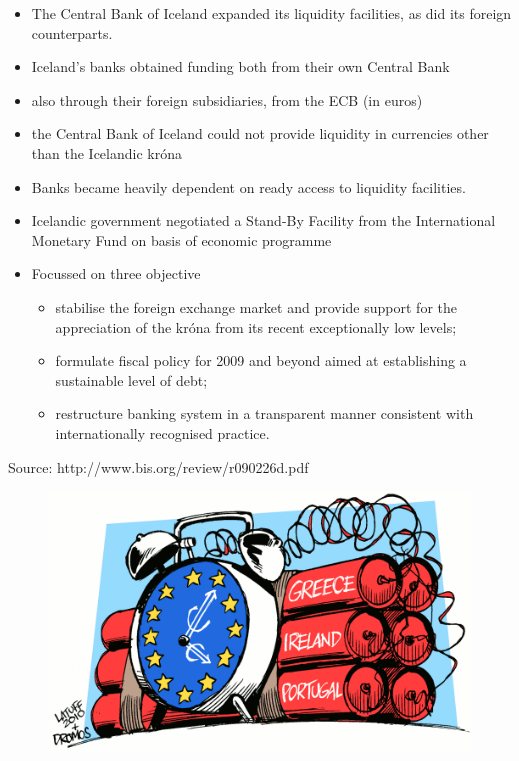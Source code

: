 \documentclass[11pt]{beamer}
\begin{document}
\begin{frame}
\begin{itemize}
\item The Central Bank of Iceland expanded its liquidity facilities, as did its foreign counterparts.
\item Iceland’s banks obtained funding both from their own Central Bank \item also through their foreign subsidiaries, from the ECB (in euros)
\item the Central Bank of Iceland could not provide liquidity in currencies other than the Icelandic króna
\item Banks became heavily dependent on ready access to liquidity facilities.
\item Icelandic government negotiated a Stand-By Facility
from the International Monetary Fund on basis of economic programme
\item Focussed on three objective
\begin{itemize}
\item stabilise the foreign exchange market and provide support for
the appreciation of the króna from its recent exceptionally low levels; \item formulate fiscal policy for 2009 and beyond aimed at establishing a sustainable level of debt;
\item restructure  banking system in a transparent manner consistent with internationally recognised practice.
\end{itemize}
\end{itemize}
\tiny{Source: http://www.bis.org/review/r090226d.pdf}
\end{frame}




\begin{frame}
\begin{figure}
\includegraphics[width=1 \textwidth]{Europe1.png}
\end{figure}
\end{frame}
\end{document}
